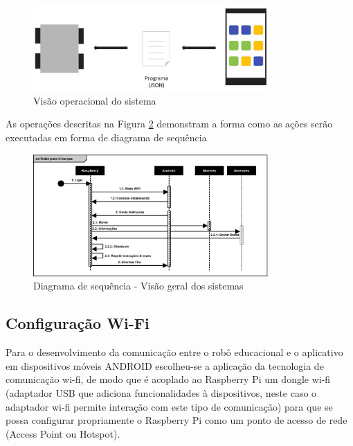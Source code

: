 \begin{figure}[H]
    \centering
    \includegraphics[width=0.8\textwidth]{figuras/overview.eps}
    \caption{Visão operacional do sistema}
    \label{fig:overview}
\end{figure}

As operações descritas na Figura \ref{fig:sequencia} demonstram a forma como as ações serão executadas em forma de diagrama de sequência

\begin{figure}[H]
    \centering
    \includegraphics[width=0.8\textwidth]{figuras/diagrama_de_sequencia.eps}
    \caption{Diagrama de sequência - Visão geral dos sistemas}
    \label{fig:sequencia}
\end{figure}

\subsection{Configuração Wi-Fi}

Para o desenvolvimento da comunicação entre o robô educacional e o aplicativo em dispositivos móveis ANDROID escolheu-se a aplicação da
tecnologia de comunicação wi-fi, de modo que é acoplado ao Raspberry Pi um dongle wi-fi (adaptador USB que adiciona funcionalidades à
dispositivos, neste caso o adaptador wi-fi permite interação com este tipo de comunicação) para que se possa configurar propriamente o
Raspberry Pi como um ponto de acesso de rede (Access Point ou Hotspot).

